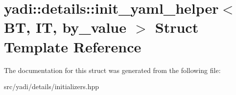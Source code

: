 \hypertarget{structyadi_1_1details_1_1init__yaml__helper}{}\section{yadi\+:\+:details\+:\+:init\+\_\+yaml\+\_\+helper$<$ BT, IT, by\+\_\+value $>$ Struct Template Reference}
\label{structyadi_1_1details_1_1init__yaml__helper}


The documentation for this struct was generated from the following file\+:\begin{DoxyCompactItemize}
\item 
src/yadi/details/initializers.\+hpp\end{DoxyCompactItemize}
